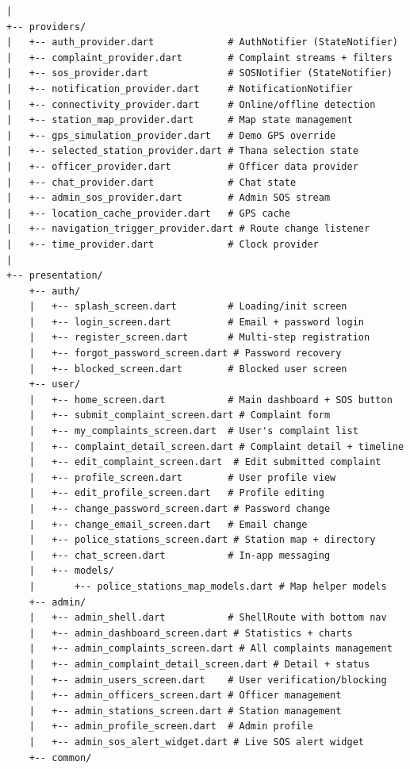 \documentclass[12pt, a4paper, twoside]{report}
\begin{document}
\begin{footnotesize}
\begin{verbatim}
|
+-- providers/
|   +-- auth_provider.dart             # AuthNotifier (StateNotifier)
|   +-- complaint_provider.dart        # Complaint streams + filters
|   +-- sos_provider.dart              # SOSNotifier (StateNotifier)
|   +-- notification_provider.dart     # NotificationNotifier
|   +-- connectivity_provider.dart     # Online/offline detection
|   +-- station_map_provider.dart      # Map state management
|   +-- gps_simulation_provider.dart   # Demo GPS override
|   +-- selected_station_provider.dart # Thana selection state
|   +-- officer_provider.dart          # Officer data provider
|   +-- chat_provider.dart             # Chat state
|   +-- admin_sos_provider.dart        # Admin SOS stream
|   +-- location_cache_provider.dart   # GPS cache
|   +-- navigation_trigger_provider.dart # Route change listener
|   +-- time_provider.dart             # Clock provider
|
+-- presentation/
    +-- auth/
    |   +-- splash_screen.dart         # Loading/init screen
    |   +-- login_screen.dart          # Email + password login
    |   +-- register_screen.dart       # Multi-step registration
    |   +-- forgot_password_screen.dart # Password recovery
    |   +-- blocked_screen.dart        # Blocked user screen
    +-- user/
    |   +-- home_screen.dart           # Main dashboard + SOS button
    |   +-- submit_complaint_screen.dart # Complaint form
    |   +-- my_complaints_screen.dart  # User's complaint list
    |   +-- complaint_detail_screen.dart # Complaint detail + timeline
    |   +-- edit_complaint_screen.dart  # Edit submitted complaint
    |   +-- profile_screen.dart        # User profile view
    |   +-- edit_profile_screen.dart   # Profile editing
    |   +-- change_password_screen.dart # Password change
    |   +-- change_email_screen.dart   # Email change
    |   +-- police_stations_screen.dart # Station map + directory
    |   +-- chat_screen.dart           # In-app messaging
    |   +-- models/
    |       +-- police_stations_map_models.dart # Map helper models
    +-- admin/
    |   +-- admin_shell.dart           # ShellRoute with bottom nav
    |   +-- admin_dashboard_screen.dart # Statistics + charts
    |   +-- admin_complaints_screen.dart # All complaints management
    |   +-- admin_complaint_detail_screen.dart # Detail + status
    |   +-- admin_users_screen.dart    # User verification/blocking
    |   +-- admin_officers_screen.dart # Officer management
    |   +-- admin_stations_screen.dart # Station management
    |   +-- admin_profile_screen.dart  # Admin profile
    |   +-- admin_sos_alert_widget.dart # Live SOS alert widget
    +-- common/

\end{verbatim}
\end{footnotesize}
\end{document}
